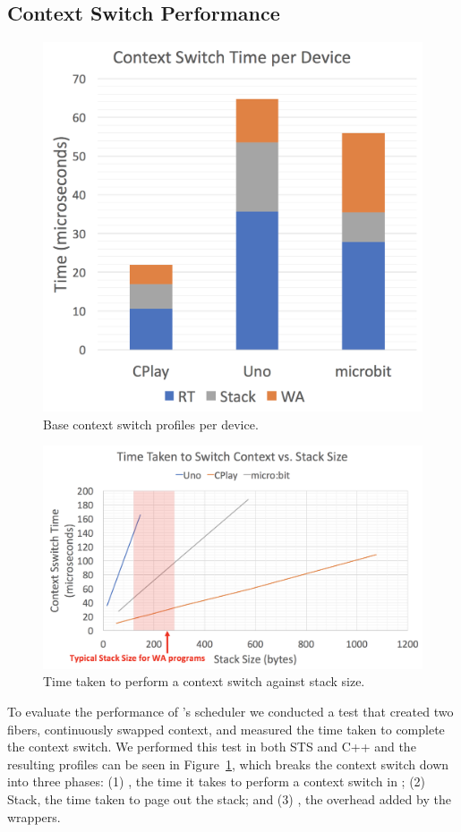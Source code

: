 \subsection{Context Switch Performance}

\begin{figure}[ht]
    \includegraphics[width=.7\columnwidth]{images/context-switch.png}
\caption{\label{fig:context-switch}Base context switch profiles per device.}
\end{figure}

\begin{figure}[ht]
    \includegraphics[width=.99\columnwidth]{images/context-vs-stack.png}
\caption{\label{fig:context-vs-stack}Time taken to perform a context switch against stack size.}
\end{figure}

To evaluate the performance of \CON's scheduler we conducted a test that created two fibers, continuously swapped context, and measured the time taken to complete the context switch.
We performed this test in both STS and C++ and the resulting profiles can be seen in Figure~\ref{fig:context-switch}, which
breaks the context switch down into three phases:
(1) \CO, the time it takes to perform a context switch in \CO;
(2) Stack, the time taken to page out the \MC stack; and
(3) \MCN, the overhead added by the \MC wrappers.

